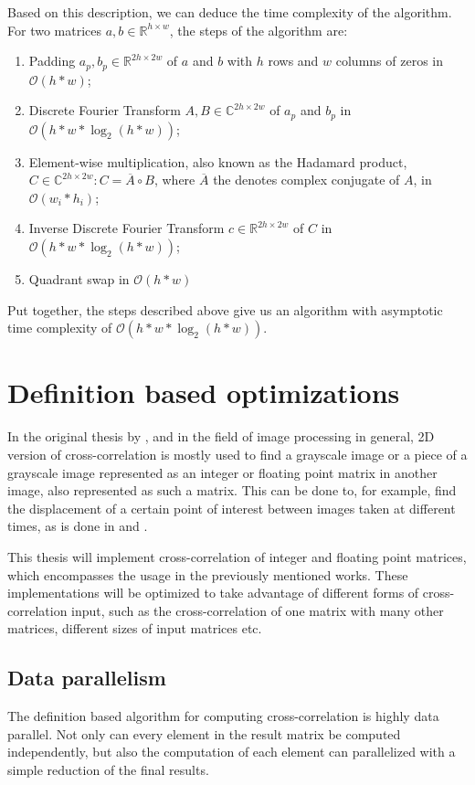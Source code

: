 Based on this description, we can deduce the time complexity of the algorithm. For two matrices $a,b \in \mathbb{R}^{h \times w}$, the steps of the algorithm are:
\begin{enumerate}
	\item Padding $a_p, b_p \in \mathbb{R}^{2h \times 2w}$ of $a$ and $b$ with $h$ rows and $w$ columns of zeros in $\mathcal{O}(h*w)$;
	\item Discrete Fourier Transform $A,B 
	\in \mathbb{C}^{2h \times 2w}$ of $a_p$ and $b_p$ in $\mathcal{O}(h*w*\log_2(h*w))$;
	\item Element-wise multiplication, also known as the Hadamard product, $C \in \mathbb{C}^{2h \times 2w}: C = \overline{A} \circ B$, where $\overline{A}$ the denotes complex conjugate of $A$, in $\mathcal{O}(w_i*h_i)$;
	\item Inverse Discrete Fourier Transform $c \in \mathbb{R}^{2h \times 2w}$ of $C$ in $\mathcal{O}(h*w*\log_2(h*w))$;
	\item Quadrant swap in $\mathcal{O}(h*w)$
\end{enumerate}

Put together, the steps described above give us an algorithm with asymptotic time complexity of $\mathcal{O}(h*w*\log_2(h*w))$.

\section{Definition based optimizations}
\label{sec:cross_corr_opt}
In the original thesis by \citet{misko}, and in the field of image processing in general, 2D version of cross-correlation is mostly used to find a grayscale image or a piece of a grayscale image represented as an integer or floating point matrix in another image, also represented as such a matrix. This can be done to, for example, find the displacement of a certain point of interest between images taken at different times, as is done in \citet{misko} and \citet{zhang2015}. 

This thesis will implement cross-correlation of integer and floating point matrices, which encompasses the usage in the previously mentioned works. These implementations will be optimized to take advantage of different forms of cross-correlation input, such as the cross-correlation of one matrix with many other matrices, different sizes of input matrices etc. 

\subsection{Data parallelism}
\label{sec:cross_corr_para}
The definition based algorithm for computing cross-correlation is highly data parallel. Not only can every element in the result matrix be computed independently, but also the  computation of each element can parallelized with a simple reduction of the final results.

